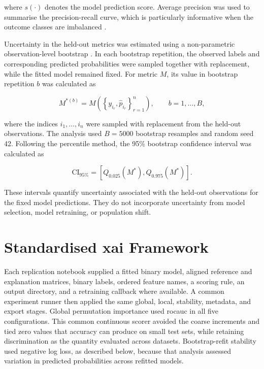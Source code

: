 where $s(\cdot)$ denotes the model prediction score. Average precision was used to summarise the precision-recall curve, which is particularly informative when the outcome classes are imbalanced \citep{saito_precision-recall_2015}.

Uncertainty in the held-out metrics was estimated using a non-parametric observation-level bootstrap \citep{efron_introduction_1993}. In each bootstrap repetition, the observed labels and corresponding predicted probabilities were sampled together with replacement, while the fitted model remained fixed. For metric $M$, its value in bootstrap repetition $b$ was calculated as

\begin{equation}
M^{*(b)}
=
M\left(
\left\{y_{i_r},\widehat{p}_{i_r}\right\}_{r=1}^{n}
\right),
\qquad b=1,\ldots,B,
\end{equation}

where the indices $i_1,\ldots,i_n$ were sampled with replacement from the held-out observations. The analysis used $B=5000$ bootstrap resamples and random seed 42. Following the percentile method, the 95\% bootstrap confidence interval was calculated as \citep{efron_introduction_1993}

\begin{equation}
\mathrm{CI}_{95\%}
=
\left[
Q_{0.025}\left(M^*\right),
Q_{0.975}\left(M^*\right)
\right].
\end{equation}

These intervals quantify uncertainty associated with the held-out observations for the fixed model predictions. They do not incorporate uncertainty from model selection, model retraining, or population shift.


\section{Standardised \gls{xai} Framework}

Each replication notebook supplied a fitted binary model, aligned reference and explanation matrices, binary labels, ordered feature names, a scoring rule, an output directory, and a retraining callback where available. A common experiment runner then applied the same global, local, stability, metadata, and export stages. Global permutation importance used \gls{rocauc} in all five configurations. This common continuous scorer avoided the coarse increments and tied zero values that accuracy can produce on small test sets, while retaining discrimination as the quantity evaluated across datasets. Bootstrap-refit stability used negative log loss, as described below, because that analysis assessed variation in predicted probabilities across refitted models.


